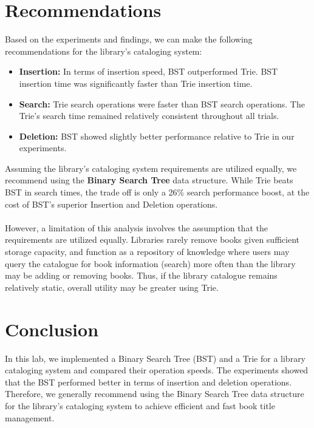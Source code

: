 \documentclass{article}
\begin{document}
\section{Recommendations}
Based on the experiments and findings, we can make the following recommendations for the library's cataloging system:

\begin{itemize}
    \item \textbf{Insertion:} In terms of insertion speed, BST outperformed Trie. BST insertion time was significantly faster than Trie insertion time.

    \item \textbf{Search:} Trie search operations were faster than BST search operations. The Trie's search time remained relatively consistent throughout all trials.

    \item \textbf{Deletion:} BST showed slightly better performance relative to Trie in our experiments.
\end{itemize}
Assuming the library's cataloging system requirements are utilized equally, we recommend using the \textbf{Binary Search Tree} data structure. While Trie beats BST in search times, the trade off is only a 26\% search performance boost, at the cost of BST's superior Insertion and Deletion operations. 
\\ \\
However, a limitation of this analysis involves the assumption that the requirements are utilized equally. Libraries rarely remove books given sufficient storage capacity, and function as a repository of knowledge where users may query the catalogue for book information (search) more often than the library may be adding or removing books. Thus, if the library catalogue remains relatively static, overall utility may be greater using Trie. 

\section{Conclusion}
In this lab, we implemented a Binary Search Tree (BST) and a Trie for a library cataloging system and compared their operation speeds. The experiments showed that the BST performed better in terms of insertion and deletion operations. Therefore, we generally recommend using the Binary Search Tree data structure for the library's cataloging system to achieve efficient and fast book title management.
\end{document}
